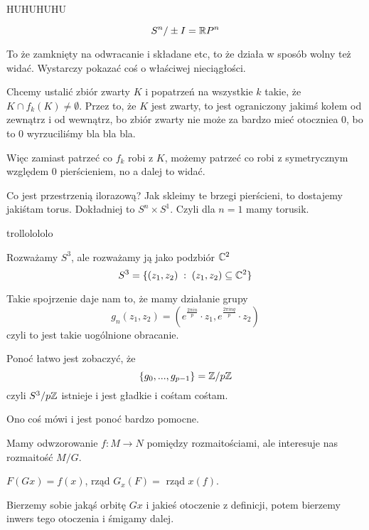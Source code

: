 \documentclass{article}
\begin{document}
\begin{problem}[16]{}
HUHUHUHU
\end{problem}

$$S^n/\pm I=\mathbb{R} P^n$$

\begin{problem}[17]{}

\end{problem}

To że zamknięty na odwracanie i składane etc, to że działa w sposób wolny też widać. Wystarczy pokazać coś o właściwej nieciągłości.

Chcemy ustalić zbiór zwarty $K$ i popatrzeń na wszystkie $k$ takie, że $K\cap f_k(K)\neq\emptyset$. Przez to, że $K$ jest zwarty, to jest ograniczony jakimś kołem od zewnątrz i od wewnątrz, bo zbiór zwarty nie może za bardzo mieć otoczniea $0$, bo to $0$ wyrzuciliśmy bla bla bla. 

Więc zamiast patrzeć co $f_k$ robi z $K$, możemy patrzeć co robi z symetrycznym względem $0$ pierścieniem, no a dalej to widać.

Co jest przestrzenią ilorazową? Jak skleimy te brzegi pierścieni, to dostajemy jakiśtam torus. Dokładniej to $S^n\times S^1$. Czyli dla $n=1$ mamy torusik.

\begin{problem}[18]{}
trollolololo
\end{problem}

Rozważamy $S^3$, ale rozważamy ją jako podzbiór $\mathbb{C}^2$
$$S^3=\{(z_1,z_2)\;:\;(z_1,z_2)\subseteq\mathbb{C}^2\}$$

Takie spojrzenie daje nam to, że mamy działanie grupy
$$g_n(z_1,z_2)=(e^{\frac{2\pi i n}{p}}\cdot z_1,e^{\frac{2\pi inq}{p}}\cdot z_2)$$
czyli to jest takie uogólnione obracanie.

Ponoć łatwo jest zobaczyć, że
$$\{g_0,...,g_{p-1}\}=\mathbb{Z}/p\mathbb{Z}$$
czyli $S^3/p\mathbb{Z}$ istnieje i jest gładkie i cośtam cośtam.

\begin{problem}[19]{}
Ono coś mówi i jest ponoć bardzo pomocne.
\end{problem}

Mamy odwzorowanie $f:M\to N$ pomiędzy rozmaitościami, ale interesuje nas rozmaitość $M/G$.




$F(Gx)=f(x)$, rząd $G_x(F)=$ rząd $x(f)$.

Bierzemy sobie jakąś orbitę $Gx$ i jakieś otoczenie z definicji, potem bierzemy inwers tego otoczenia i śmigamy dalej.
\end{document}
